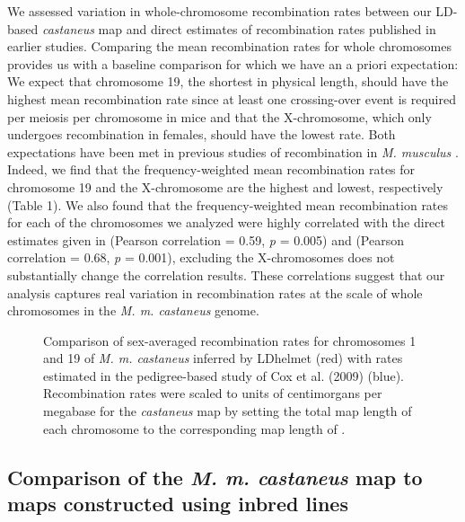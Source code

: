 We assessed variation in whole-chromosome recombination rates between our LD-based \textit{castaneus} map and direct estimates of recombination rates published in earlier studies. Comparing the mean recombination rates for whole chromosomes provides us with a baseline comparison for which we have an a priori expectation: We expect that chromosome 19, the shortest in physical length, should have the highest mean recombination rate since at least one crossing-over event is required per meiosis per chromosome in mice and that the X-chromosome, which only undergoes recombination in females, should have the lowest rate. Both expectations have been met in previous studies of recombination in \emph{M. musculus} \citep{RN320, 323}. Indeed, we find that the frequency-weighted mean recombination rates for chromosome 19 and the X-chromosome are the highest and lowest, respectively (Table 1). We also found that the frequency-weighted mean recombination rates for each of the chromosomes we analyzed were highly correlated with the direct estimates given in \cite{RN320} (Pearson correlation = 0.59, \emph{p} = 0.005) and \cite{RN232} (Pearson correlation = 0.68, \emph{p} = 0.001), excluding the X-chromosomes does not substantially change the correlation results. These correlations suggest that our analysis captures real variation in recombination rates at the scale of whole chromosomes in the \emph{M. m. castaneus} genome. 

\begin{figure}[h]
   \centering      
   \noindent{}
 \caption[Comparison of LD-based and pedigree-based recombination maps]{Comparison of sex-averaged recombination rates for chromosomes 1 and 19 of \emph{M. m. castaneus} inferred by LDhelmet (red) with rates estimated in the pedigree-based study of Cox et al. (2009) (blue). Recombination rates were scaled to units of centimorgans per megabase for the \textit{castaneus} map by setting the total map length of each chromosome to the corresponding map length of \cite{RN232}.}
\end{figure}

\linespread{1}

\linespread{2}


\subsection{Comparison of the \emph{M. m. castaneus} map to maps constructed using inbred lines}
 
